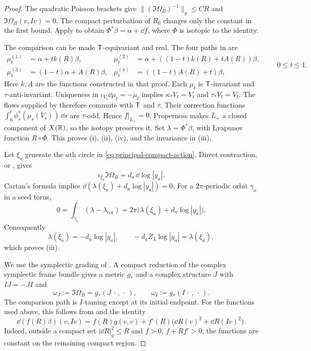 \documentclass[12pt, letter]{amsart}
\theoremstyle{definition}
\numberwithin{equation}{section}
\begin{document}
\begin{proof}
The quadratic Poisson brackets give
$
 \| (\Im\Omega_B)^{-1}\|_g\le C R$ and $\Im\Omega_B(v,Iv)=0.$
The compact perturbation of $R_0$ changes only the constant in
the first bound. Apply \cite[Theorem~1.4 and proof of
Corollary~1.6]{HSinv} to obtain
$\Phi^*\beta=\alpha+\dd f$,
where $\Phi$ is isotopic to the identity.

The comparison can be made $\mathsf T$-equivariant and real.
The four paths in \cite[Section~4]{HSinv} are
\[
 \begin{aligned}
 \mu^{(1)}_t&=\alpha+t k(R)\beta, &
 \mu^{(2)}_t&=\alpha+((1-t)k(R)+tA(R))\beta,\\
 \mu^{(3)}_t&=(1-t)\alpha+A(R)\beta, &
 \mu^{(4)}_t&=((1-t)A(R)+t)\beta,
 \end{aligned}
 \qquad 0\le t\le1.
\]
Here $k,A$ are the functions constructed in that proof.
Each $\mu_t$ is $\mathsf T$-invariant and $\tau$-anti-invariant.
Uniqueness in
$\iota_{V_t}\dd\mu_t=-\dot\mu_t$
implies $\kappa_*V_t=V_t$ and $\tau_*V_t=V_t$.
The flows supplied by \cite{HSinv} therefore commute with $\mathsf T$ and $\tau$.
Their correction functions
$\int_0^t\phi_s^*(\mu_s(V_s))\,\dd s$ are $\tau$-odd.
Hence $f|_{L_+}=0$.
Properness makes $L_+$ a closed component of $X(\mathbb R)$,
so the isotopy preserves it.
Set $\lambda=\Phi^*\beta$, with Lyapunov function $R\circ\Phi$.
This proves (i), (ii), (iv), and the invariance in (iii).

Let $\xi_a$ generate the $a$th circle in
\eqref{eq:principal-compact-action}. Direct contraction, or
\cite[equation~(46)]{HS}, gives
\[
 \iota_{\xi_a}\Im\Omega_B=d_a\,\dd\log|y_a|.
\]
Cartan's formula implies
$\dd(\lambda(\xi_a)+d_a\log|y_a|)=0$.
For a $2\pi$-periodic orbit $\gamma_a$ in a seed torus,
\[
 0=\int_{\gamma_a}(\lambda-\lambda_{\mathrm{tor}})
   =2\pi\bigl(\lambda(\xi_a)+d_a\log|y_a|\bigr).
\]
Consequently
\[
 \lambda(\xi_a)=-d_a\log|y_a|,
 \qquad
 -d_a Z_\lambda\log|y_a|=\lambda(\xi_a),
\]
which proves (iii).

We use the symplectic grading of \cite[Section~5.2]{HS}.
A compact reduction of the complex symplectic frame bundle gives
a metric $g_*$ and a complex structure $J$ with $IJ=-JI$ and
\[
 \omega_J:=\Im\Omega_B=g_*(J\,\cdot\,,\,\cdot\,),\qquad
 \omega_I:=g_*(I\,\cdot\,,\,\cdot\,).
\]
The comparison path is $I$-taming except at its initial endpoint.
For the functions used above, this follows from
\cite[Lemmas~4.3 and~4.6]{HSinv} and the identity
\[
 \dd(f(R)\beta)(v,Iv)
 =f(R)g(v,v)+f'(R)
       \bigl(\dd R(v)^2+\dd R(Iv)^2\bigr).
\]
Indeed, outside a compact set $|\dd R|_g^2\le R$ and
$f>0$, $f+Rf'>0$; the functions are constant on the remaining
compact region.


\end{proof}
\end{document}
